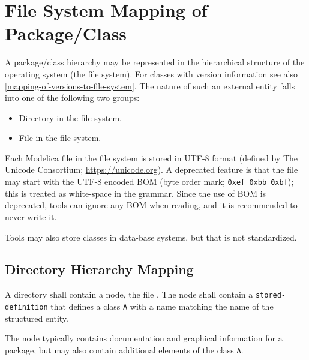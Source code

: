 \section{File System Mapping of Package/Class}\label{mapping-package-class-structures-to-a-hierarchical-file-system}\label{file-system-mapping-of-package-class}

A package/class hierarchy may be represented in the hierarchical structure of the operating system (the file system).
For classes with version information see also \cref{mapping-of-versions-to-file-system}.
The nature of such an external entity falls into one of the following two groups:
\begin{itemize}
\item
  Directory in the file system.
\end{itemize}

\begin{itemize}
\item
  File in the file system.
\end{itemize}

Each Modelica file in the file system is stored in UTF-8 format (defined by The Unicode Consortium; \url{https://unicode.org}).
A deprecated feature is that the file may start with the UTF-8 encoded BOM (byte order mark; \lstinline!0xef 0xbb 0xbf!); this is treated as white-space in the grammar.
Since the use of BOM is deprecated, tools can ignore any BOM when reading, and it is recommended to never write it.

\begin{nonnormative}
Tools may also store classes in data-base systems, but that is not standardized.
\end{nonnormative}


\subsection{Directory Hierarchy Mapping}\label{mapping-a-package-class-hierarchy-into-a-directory-hierarchy-structured-entity}\label{directory-hierarchy-mapping}

A directory shall contain a node, the file .
The node shall contain a \lstinline[language=grammar]!stored-definition! that defines a class \lstinline!A! with a name matching the name of the structured entity.

\begin{nonnormative}
The node typically contains documentation and graphical information for a package, but may also contain additional elements of the class \lstinline!A!.
\end{nonnormative}

